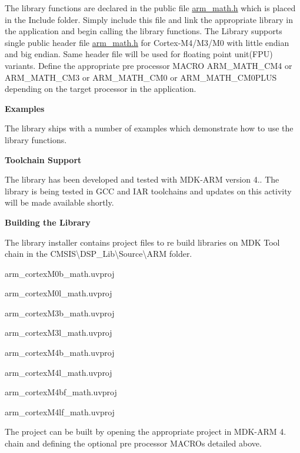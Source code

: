 The library functions are declared in the public file {\ttfamily \mbox{\hyperlink{arm__math_8h}{arm\+\_\+math.\+h}}} which is placed in the {\ttfamily Include} folder. Simply include this file and link the appropriate library in the application and begin calling the library functions. The Library supports single public header file {\ttfamily  \mbox{\hyperlink{arm__math_8h}{arm\+\_\+math.\+h}}} for Cortex-\/\+M4/\+M3/\+M0 with little endian and big endian. Same header file will be used for floating point unit(\+F\+P\+U) variants. Define the appropriate pre processor M\+A\+C\+RO A\+R\+M\+\_\+\+M\+A\+T\+H\+\_\+\+C\+M4 or A\+R\+M\+\_\+\+M\+A\+T\+H\+\_\+\+C\+M3 or A\+R\+M\+\_\+\+M\+A\+T\+H\+\_\+\+C\+M0 or A\+R\+M\+\_\+\+M\+A\+T\+H\+\_\+\+C\+M0\+P\+L\+US depending on the target processor in the application.

{\bfseries{Examples}}

The library ships with a number of examples which demonstrate how to use the library functions.

{\bfseries{Toolchain Support}}

The library has been developed and tested with M\+D\+K-\/\+A\+RM version 4.. The library is being tested in G\+CC and I\+AR toolchains and updates on this activity will be made available shortly.

{\bfseries{Building the Library}}

The library installer contains project files to re build libraries on M\+DK Tool chain in the {\ttfamily C\+M\+S\+IS\textbackslash{}D\+S\+P\+\_\+\+Lib\textbackslash{}Source\textbackslash{}A\+RM} folder.
\begin{DoxyItemize}
\item arm\+\_\+cortex\+M0b\+\_\+math.\+uvproj
\item arm\+\_\+cortex\+M0l\+\_\+math.\+uvproj
\item arm\+\_\+cortex\+M3b\+\_\+math.\+uvproj
\item arm\+\_\+cortex\+M3l\+\_\+math.\+uvproj
\item arm\+\_\+cortex\+M4b\+\_\+math.\+uvproj
\item arm\+\_\+cortex\+M4l\+\_\+math.\+uvproj
\item arm\+\_\+cortex\+M4bf\+\_\+math.\+uvproj
\item arm\+\_\+cortex\+M4lf\+\_\+math.\+uvproj
\end{DoxyItemize}

The project can be built by opening the appropriate project in M\+D\+K-\/\+A\+RM 4. chain and defining the optional pre processor M\+A\+C\+R\+Os detailed above.

